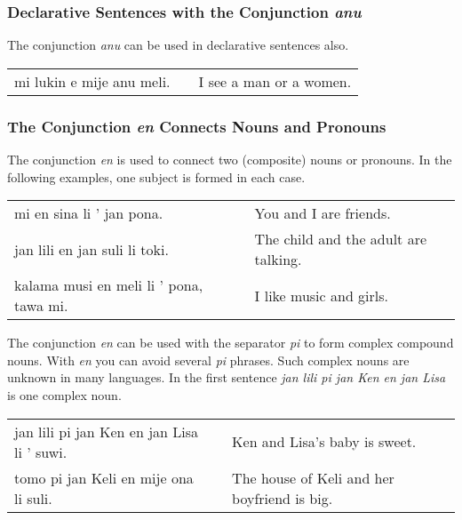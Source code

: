 %
\subsubsection*{Declarative Sentences with the Conjunction \textit{anu}}
%

The conjunction \textit{anu} can be used in declarative sentences also.

\begin{supertabular}{p{5,5cm}|ll}
mi lukin e mije anu meli. && I see a man or a women. \\ 
\end{supertabular} 

%
\subsubsection*{The Conjunction \textit{en} Connects Nouns and Pronouns}
%
%
The conjunction \textit{en} is used to connect two (composite) nouns or pronouns. 
In the following examples, one subject is formed in each case.

\begin{supertabular}{p{5,5cm}|ll}
mi en sina li ' jan pona. && You and I are friends. \\
jan lili en jan suli li toki. && The child and the adult are talking. \\
kalama musi en meli li ' pona, tawa mi. && I like music and girls. \\
\end{supertabular} 

The conjunction \textit{en} can be used with the separator \textit{pi} to form complex compound nouns. 
With \textit{en} you can avoid several \textit{pi} phrases.
Such complex nouns are unknown in many languages. 
In the first sentence \textit{jan lili pi jan Ken en jan Lisa} is one complex noun. 

\begin{supertabular}{p{5,5cm}|ll}
jan lili pi jan Ken en jan Lisa li ' suwi. && Ken and Lisa's baby is sweet. \\
tomo pi jan Keli en mije ona li suli. && The house of Keli and her boyfriend is big. \\
\end{supertabular} 
%


